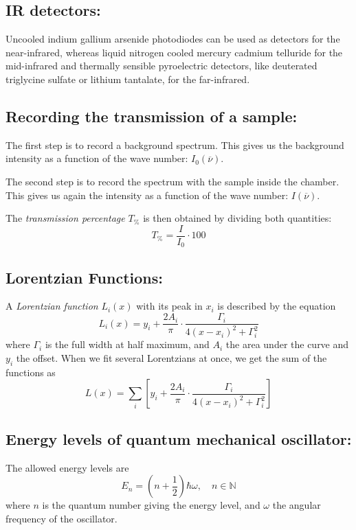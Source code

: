 \documentclass[12pt]{article}
\begin{document}
\subsection{IR detectors:} Uncooled indium gallium arsenide photodiodes can be used as detectors for the near-infrared, whereas liquid nitrogen cooled mercury cadmium telluride for the mid-infrared and thermally sensible pyroelectric detectors, like deuterated triglycine sulfate or lithium tantalate, for the far-infrared. 

\subsection{Recording the transmission of a sample:}

The first step is to record a background spectrum. This gives us the background intensity as a function of the wave number: $I_0 (\overline{\nu})$.

The second step is to record the spectrum with the sample inside the chamber. This gives us again the intensity as a function of the wave number: $I(\overline{\nu})$.

The \textit{transmission percentage} $T_\%$ is then obtained by dividing both quantities:
\begin{equation}
    \boxed{T_\% = \frac{I}{I_0} \cdot 100}
    \label{eq:IRTransmission}
\end{equation}

\subsection{Lorentzian Functions:}

A \textit{Lorentzian function} $L_i(x)$ with its peak in $x_i$ is described by the equation
\begin{equation}
    \boxed{L_i(x) = y_i + \frac{2 A_i}{\pi} \cdot \frac{\Gamma_i}{4(x - x_i)^2 + \Gamma_i^2}}
\end{equation}
where $\Gamma_i$  is the full width at half maximum, and $A_i$ the area under the curve and $y_i$ the offset. When we fit several Lorentzians at once, we get the sum of the functions as
\begin{equation}
    L(x) = \sum_i \left[ y_i + \frac{2 A_i}{\pi} \cdot \frac{\Gamma_i}{4(x - x_i)^2 + \Gamma_i^2} \right]
\end{equation}

\subsection{Energy levels of quantum mechanical oscillator:}
The allowed energy levels are \cite{SakuraiModernQuantumMechanics}
\begin{equation}
    E_n = \left( n + \frac{1}{2} \right) \hbar \omega, \quad n \in \mathbb{N}
\end{equation}
where $n$ is the quantum number giving the energy level, and $\omega$ the angular frequency of the oscillator.
\end{document}

